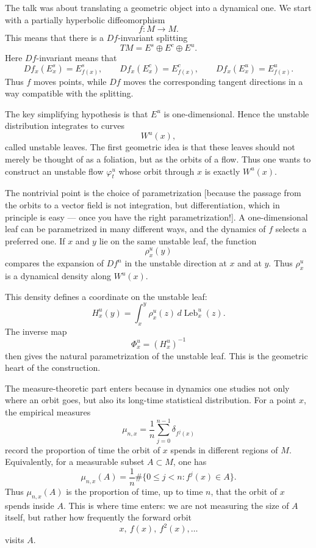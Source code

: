 \begin{remark}
\label{remark-ai-overview-seminar-unstable-flow}
The talk was about translating a geometric
object into a dynamical one. We start with a
partially hyperbolic diffeomorphism
$$
f:M\to M.
$$
This means that there is a $Df$-invariant
splitting
$$
TM=E^s\oplus E^c\oplus E^u.
$$
Here $Df$-invariant means that
$$
Df_x(E_x^s)=E_{f(x)}^s,\qquad
Df_x(E_x^c)=E_{f(x)}^c,\qquad
Df_x(E_x^u)=E_{f(x)}^u.
$$
Thus $f$ moves points, while $Df$ moves the
corresponding tangent directions in a way
compatible with the splitting.

\medskip\noindent
The key simplifying hypothesis is that
$E^u$ is one-dimensional. Hence the unstable
distribution integrates to curves
$$
W^u(x),
$$
called unstable leaves. The first geometric
idea is that these leaves should not merely
be thought of as a foliation, but as the
orbits of a flow. Thus one wants to construct
an unstable flow $\varphi_t^u$ whose orbit
through $x$ is exactly $W^u(x)$.

\medskip\noindent
The nontrivial point is the choice of
parametrization
[because the passage from the orbits
to a vector field is not integration,
but differentiation, which in principle
is easy --- once you have
the right parametrization!]. 
A one-dimensional leaf can
be parametrized in many different ways, and
the dynamics of $f$ selects a preferred one.
If $x$ and $y$ lie on the same unstable leaf,
the function
$$
\rho_x^u(y)
$$
compares the expansion of $Df^n$ in the
unstable direction at $x$ and at $y$. Thus
$\rho_x^u$ is a dynamical density along
$W^u(x)$.

\medskip\noindent
This density defines a coordinate on the
unstable leaf:
$$
H_x^u(y)
=
\int_x^y
\rho_x^u(z)\,d\operatorname{Leb}_x^u(z).
$$
The inverse map
$$
\Phi_x^u=(H_x^u)^{-1}
$$
then gives the natural parametrization of the
unstable leaf. This is the geometric heart of
the construction.

\medskip\noindent
The measure-theoretic part enters because in
dynamics one studies not only where an orbit
goes, but also its long-time statistical
distribution. For a point $x$, the empirical
measures
$$
\mu_{n,x}
=
\frac{1}{n}
\sum_{j=0}^{n-1}
\delta_{f^j(x)}
$$
record the proportion of time the orbit of
$x$ spends in different regions of $M$.
Equivalently, for a measurable subset
$A\subset M$, one has
$$
\mu_{n,x}(A)
=
\frac{1}{n}
\#\{0\leq j<n:f^j(x)\in A\}.
$$
Thus $\mu_{n,x}(A)$ is the proportion of
time, up to time $n$, that the orbit of $x$
spends inside $A$. This is where time enters:
we are not measuring the size of $A$ itself,
but rather how frequently the forward orbit
$$
x,\ f(x),\ f^2(x),\ldots
$$
visits $A$.


\end{remark}
